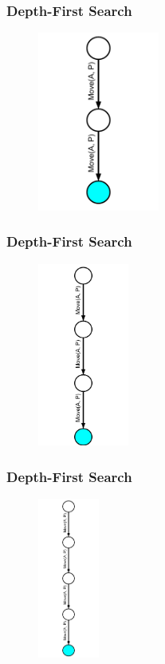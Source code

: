 \documentclass{beamer}
\begin{document}
\begin{frame}[fragile]
\frametitle{Depth-First Search}
\begin{figure}[h]
	\includegraphics[width=4cm]{Diagrams/DepthFirst/DepthFirstTwo.pdf}
	\centering
\end{figure}
\end{frame}

\begin{frame}[fragile]
\frametitle{Depth-First Search}
\begin{figure}[h]
	\includegraphics[width=3cm]{Diagrams/DepthFirst/DepthFirstThree.pdf}
	\centering
\end{figure}
\end{frame}

\begin{frame}[fragile]
\frametitle{Depth-First Search}
\begin{figure}[h]
	\includegraphics[width=2cm]{Diagrams/DepthFirst/DepthFirstFour.pdf}
	\centering
\end{figure}
\end{frame}
\end{document}
